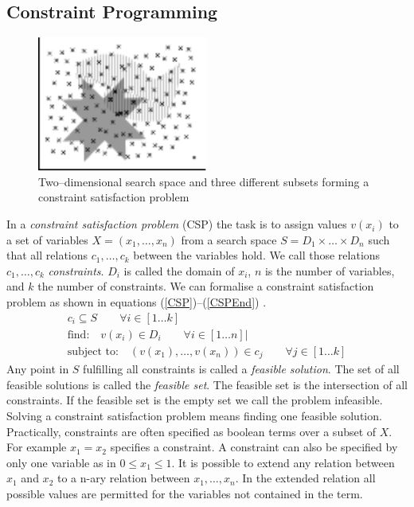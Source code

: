 \subsection{Constraint Programming}
\begin{figure}
\label{fig:CSPExample}
\includegraphics[width=0.5\textwidth]{./pics/SetIntersection.pdf}
\caption{Two--dimensional search space and three different subsets forming a constraint satisfaction problem}
\end{figure}
In a \emph{constraint satisfaction problem} (CSP) the task is to assign values $v(x_i)$ to a set of variables $X = (x_1, \dots , x_n)$ from a search space $S=D_1\times \dots \times D_n$ such that all relations $c_1,\dots,c_k$ between the variables hold. We call those relations $c_1,\dots,c_k$ \emph{constraints}. $D_i$ is called the domain of $x_i$, $n$ is the number of variables, and $k$ the number of constraints. We can formalise a constraint satisfaction problem as shown in equations (\ref{CSP})--(\ref{CSPEnd}) \cite{Eiben97constraintsatisfaction}\cite{wiki:CSP}.
\begin{eqnarray} 
\label{CSP}
c_i \subseteq S \qquad\forall i \in \left[ 1 \dots k \right]\\
\text{find:} \quad v(x_i) \in D_i \qquad\forall i \in \left[ 1 \dots n \right]| \\
\label{CSPEnd}
\text{subject to:} \quad (v(x_1),\dots , v(x_n)) \in c_j\qquad\forall j \in \left[1 \dots k\right]
\end{eqnarray} 
Any point in $S$ fulfilling all constraints is called a \emph{feasible solution}. The set of all feasible solutions is called the \emph{feasible set}. The feasible set is the intersection of all constraints. If the feasible set is the empty set we call the problem infeasible. Solving a constraint satisfaction problem means finding one feasible solution.\\
Practically, constraints are often specified as boolean terms over a subset of $X$. For example $x_1=x_2$ specifies a constraint. A constraint can also be specified by only one variable as in $0\leq x_1 \leq 1$. It is possible to extend any relation between $x_1$ and $x_2$ to a n-ary relation between $x_1,\dots,x_n$. In the extended relation all possible values are permitted for the variables not contained in the term.\\
